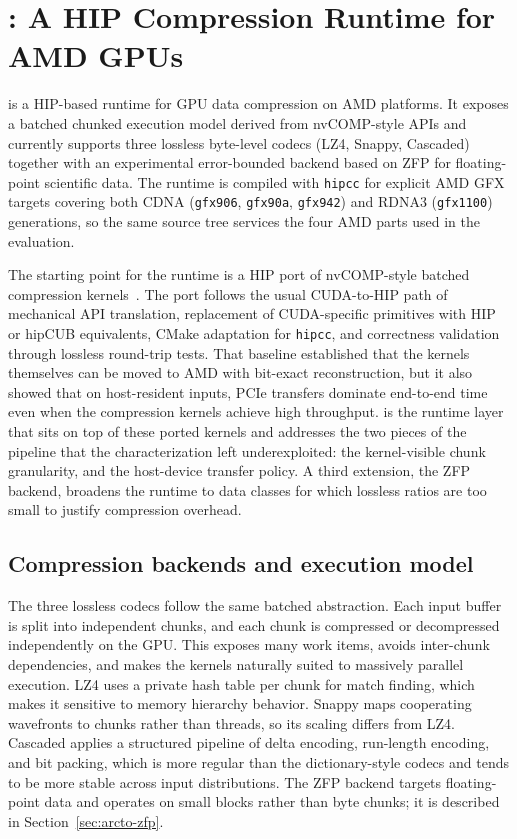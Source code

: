 \section{\arcto{}: A HIP Compression Runtime for AMD GPUs}
\label{sec:arcto-tool}

\arcto{} is a HIP-based runtime for GPU data compression on AMD
platforms. It exposes a batched chunked execution model derived from
nvCOMP-style APIs and currently supports three lossless byte-level
codecs (LZ4, Snappy, Cascaded) together with an experimental
error-bounded backend based on ZFP for floating-point scientific data.
The runtime is compiled with \texttt{hipcc} for explicit AMD GFX
targets covering both CDNA (\texttt{gfx906}, \texttt{gfx90a},
\texttt{gfx942}) and RDNA3 (\texttt{gfx1100}) generations, so the
same source tree services the four AMD parts used in the evaluation.

The starting point for the runtime is a HIP port of nvCOMP-style
batched compression kernels~\cite{anon_iccsa2026}. The port follows
the usual CUDA-to-HIP path of mechanical API translation, replacement
of CUDA-specific primitives with HIP or hipCUB equivalents, CMake
adaptation for \texttt{hipcc}, and correctness validation through
lossless round-trip tests. That baseline established that the kernels
themselves can be moved to AMD with bit-exact reconstruction, but it
also showed that on host-resident inputs, PCIe transfers dominate
end-to-end time even when the compression kernels achieve high
throughput. \arcto{} is the runtime layer that sits on top of these
ported kernels and addresses the two pieces of the pipeline that the
characterization left underexploited: the kernel-visible chunk
granularity, and the host-device transfer policy. A third extension,
the ZFP backend, broadens the runtime to data classes for which
lossless ratios are too small to justify compression overhead.

\subsection{Compression backends and execution model}
\label{sec:arcto-execution-model}

The three lossless codecs follow the same batched abstraction. Each
input buffer is split into independent chunks, and each chunk is
compressed or decompressed independently on the GPU. This exposes
many work items, avoids inter-chunk dependencies, and makes the
kernels naturally suited to massively parallel execution. LZ4 uses
a private hash table per chunk for match finding, which makes it
sensitive to memory hierarchy behavior. Snappy maps cooperating
wavefronts to chunks rather than threads, so its scaling differs
from LZ4. Cascaded applies a structured pipeline of delta encoding,
run-length encoding, and bit packing, which is more regular than the
dictionary-style codecs and tends to be more stable across input
distributions. The ZFP backend targets floating-point data and
operates on small blocks rather than byte chunks; it is described in
Section~\ref{sec:arcto-zfp}.

